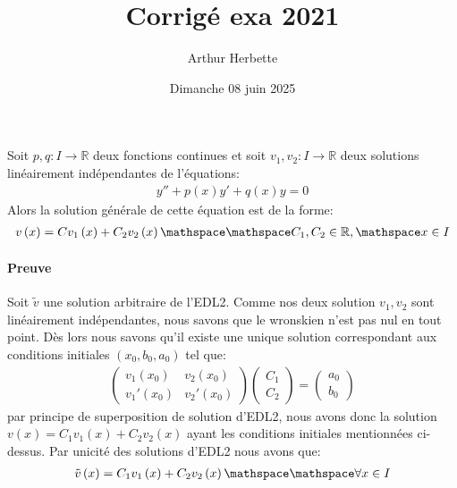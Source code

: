 \documentclass[a4paper]{article}
\title{Corrigé exa 2021}
\author{Arthur Herbette}
\date{Dimanche 08 juin 2025}
\begin{document}
Soit $p, q: I \to \mathbb{R}$ deux fonctions continues et soit $v_1, v_2: I \to \mathbb{R}$ deux solutions linéairement indépendantes de l'équations:
\begin{align*} 
    y'' + p\left(x\right)y' + q\left(x\right)y = 0
\end{align*}
Alors la solution générale de cette équation est de la forme:
\begin{align*} v\left(x\right) = Cv_1\left(x\right) + C_2v_2\left(x\right) \mathspace \mathspace C_1, C_2 \in \mathbb{R}, \mathspace x \in I  \end{align*}

\paragraph{Preuve}
Soit $\tilde{v}$ une solution arbitraire de l'EDL2. Comme nos deux solution $v_1, v_2$ sont linéairement indépendantes, nous savons que le wronskien n'est pas nul en tout point. Dès lors nous savons qu'il existe une unique solution correspondant aux conditions initiales $\left(x_0, b_0, a_0\right)$ tel que:
\begin{align*} 
    \begin{pmatrix} v_1\left(x_0\right) & v_2\left(x_0\right) \\ v_1'\left(x_0\right) & v_2'\left(x_0\right) \end{pmatrix} \begin{pmatrix} C_1  \\ C_2 \end{pmatrix} = \begin{pmatrix} a_0 \\ b_0 \end{pmatrix} 
\end{align*}
par principe de superposition de solution d'EDL2, nous avons donc la solution $v\left(x\right) = C_1v_1\left(x\right) + C_2v_2\left(x\right)$ ayant les conditions initiales mentionnées ci-dessus. Par unicité des solutions d'EDL2 nous avons que:
\begin{align*} \tilde{v}\left(x\right) = C_1v_1\left(x\right) + C_2v_2\left(x\right) \mathspace \mathspace \forall x \in I \end{align*}
\end{document}
